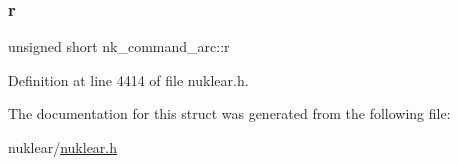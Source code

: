 \subsubsection{\texorpdfstring{r}{r}}
{\footnotesize\ttfamily unsigned short nk\+\_\+command\+\_\+arc\+::r}



Definition at line 4414 of file nuklear.\+h.



The documentation for this struct was generated from the following file\+:\begin{DoxyCompactItemize}
\item 
nuklear/\mbox{\hyperlink{nuklear_8h}{nuklear.\+h}}\end{DoxyCompactItemize}
